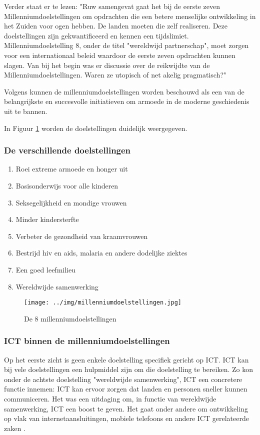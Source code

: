 Verder staat er te lezen: "Ruw samengevat gaat het bij de eerste zeven Millenniumdoelstellingen om opdrachten die een betere menselijke ontwikkeling in het Zuiden voor ogen hebben. De landen moeten die zelf realiseren. Deze doelstellingen zijn gekwantificeerd en kennen een tijdslimiet. Millenniumdoelstelling 8, onder de titel "wereldwijd partnerschap", moet zorgen voor een internationaal beleid waardoor de eerste zeven opdrachten kunnen slagen. Van bij het begin was er discussie over de reikwijdte van de Millenniumdoelstellingen. Waren ze utopisch of net akelig pragmatisch?" \autocite{11.11.112019}

Volgens \autocite{Tjoa2016} kunnen de millenniumdoelstellingen worden beschouwd als een van de belangrijkste en succesvolle initiatieven om armoede in de moderne geschiedenis uit te bannen.

In Figuur \ref{milleniumdoelstellingen} worden de doelstellingen duidelijk weergegeven.

 
 \subsubsection{De verschillende doelstellingen}
 \begin{enumerate}
 \item Roei extreme armoede en honger uit
 \item Basisonderwijs voor alle kinderen
 \item Seksegelijkheid en mondige vrouwen
 \item Minder kindersterfte
 \item Verbeter de gezondheid van kraamvrouwen
 \item Bestrijd hiv en aids, malaria en andere dodelijke ziektes
 \item Een goed leefmilieu 
 \item Wereldwijde samenwerking
\end{enumerate}
\autocite{NOS2015}

\begin{figure}[h!]
	\texttt{[image: ../img/millenniumdoelstellingen.jpg]}
	\caption{De 8 millenniumdoelstellingen \autocite{NOS2015}}
	\label{milleniumdoelstellingen}
\end{figure}

 \subsubsection{ICT binnen de millenniumdoelstellingen}
 Op het eerste zicht is geen enkele doelstelling specifiek gericht op ICT. ICT kan bij vele doelstellingen een hulpmiddel zijn om die doelstelling te bereiken. Zo kon onder de achtste doelstelling "wereldwijde samenwerking", ICT een concretere functie innemen: ICT kan ervoor zorgen dat landen en personen sneller kunnen communiceren. Het was een uitdaging om, in functie van wereldwijde samenwerking, ICT een boost te geven. Het gaat onder andere om ontwikkeling op vlak van internetaansluitingen, mobiele telefoons en andere ICT gerelateerde zaken \autocite{NOS2015}.
 

